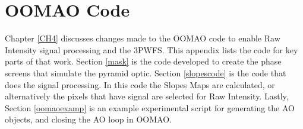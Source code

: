 \chapter{OOMAO Code}\label{OOMAOcode}

Chapter \ref{CH4} discusses changes made to the OOMAO code to enable Raw Intensity signal processing and the 3PWFS. This appendix lists the code for key parts of that work. Section \ref{mask} is the code developed to create the phase screens that simulate the pyramid optic. Section \ref{slopescode} is the code that does the signal processing. In this code the Slopes Maps are calculated, or alternatively the pixels that have signal are selected for Raw Intensity. Lastly, Section \ref{oomaoexamp} is an example experimental script for generating the AO objects, and closing the AO loop in OOMAO. 

